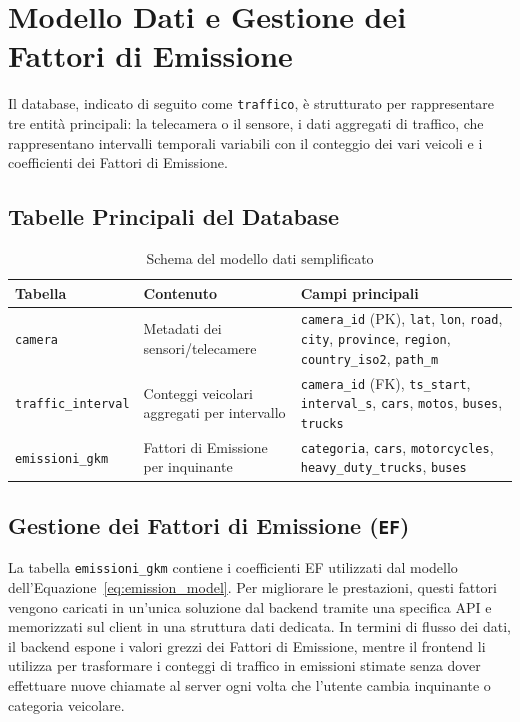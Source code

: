\documentclass[12pt, oneside]{extbook}
\begin{document}
\section{Modello Dati e Gestione dei Fattori di Emissione}

Il database, indicato di seguito come \texttt{traffico}, è strutturato
per rappresentare tre entità principali: la telecamera o il sensore, i
dati aggregati di traffico, che rappresentano intervalli temporali variabili con il conteggio dei vari veicoli e i coefficienti dei Fattori di Emissione.

\newpage
\subsection{Tabelle Principali del Database}

\begin{table}[h]
  \centering
  \caption{Schema del modello dati semplificato}
  \label{tab:schema_dati}
  \begin{tabularx}{\linewidth}{|l|X|X|}
    \hline
    \textbf{Tabella} & \textbf{Contenuto} & \textbf{Campi principali} \\
    \hline
        \texttt{camera}
      & Metadati dei sensori/telecamere
      & \texttt{camera\_id} (PK), \texttt{lat}, \texttt{lon}, \texttt{road},
        \texttt{city}, \texttt{province}, \texttt{region},
        \texttt{country\_iso2}, \texttt{path\_m} \\
    \hline
    \texttt{traffic\_interval}
      & Conteggi veicolari aggregati per intervallo
      & \texttt{camera\_id} (FK), \texttt{ts\_start}, \texttt{interval\_s},
        \texttt{cars}, \texttt{motos}, \texttt{buses}, \texttt{trucks} \\
    \hline
    \texttt{emissioni\_gkm}
      & Fattori di Emissione per inquinante
      & \texttt{categoria}, \texttt{cars}, \texttt{motorcycles},
        \texttt{heavy\_duty\_trucks}, \texttt{buses} \\
    \hline
  \end{tabularx}
\end{table}

\subsection{Gestione dei Fattori di Emissione (\texttt{EF})}

La tabella \texttt{emissioni\_gkm} contiene i coefficienti EF utilizzati
dal modello dell’Equazione~\ref{eq:emission_model}. Per migliorare le
prestazioni, questi fattori vengono caricati in un’unica soluzione dal
backend tramite una specifica API e memorizzati sul
client in una struttura dati dedicata. In
termini di flusso dei dati, il backend espone i valori grezzi dei
Fattori di Emissione, mentre il frontend li utilizza per trasformare i
conteggi di traffico in emissioni stimate senza dover effettuare nuove
chiamate al server ogni volta che l’utente cambia inquinante o categoria
veicolare.
\end{document}
